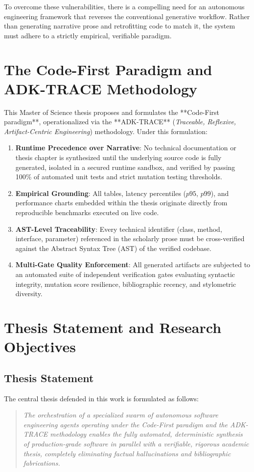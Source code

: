 To overcome these vulnerabilities, there is a compelling need for an autonomous engineering framework that reverses the conventional generative workflow. Rather than generating narrative prose and retrofitting code to match it, the system must adhere to a strictly empirical, verifiable paradigm.

\section{The Code-First Paradigm and ADK-TRACE Methodology}
\label{sec:code_first_paradigm}

This Master of Science thesis proposes and formulates the **Code-First paradigm**, operationalized via the **ADK-TRACE** (\emph{Traceable, Reflexive, Artifact-Centric Engineering}) methodology. Under this formulation:
\begin{enumerate}
    \item \textbf{Runtime Precedence over Narrative}: No technical documentation or thesis chapter is synthesized until the underlying source code is fully generated, isolated in a secured runtime sandbox, and verified by passing 100\% of automated unit tests and strict mutation testing thresholds.
    \item \textbf{Empirical Grounding}: All tables, latency percentiles ($p95$, $p99$), and performance charts embedded within the thesis originate directly from reproducible benchmarks executed on live code.
    \item \textbf{AST-Level Traceability}: Every technical identifier (class, method, interface, parameter) referenced in the scholarly prose must be cross-verified against the Abstract Syntax Tree (AST) of the verified codebase.
    \item \textbf{Multi-Gate Quality Enforcement}: All generated artifacts are subjected to an automated suite of independent verification gates evaluating syntactic integrity, mutation score resilience, bibliographic recency, and stylometric diversity.
\end{enumerate}

\section{Thesis Statement and Research Objectives}
\label{sec:thesis_objectives}

\subsection{Thesis Statement}
The central thesis defended in this work is formulated as follows:
\begin{quote}
\itshape
The orchestration of a specialized swarm of autonomous software engineering agents operating under the Code-First paradigm and the ADK-TRACE methodology enables the fully automated, deterministic synthesis of production-grade software in parallel with a verifiable, rigorous academic thesis, completely eliminating factual hallucinations and bibliographic fabrications.
\end{quote}

